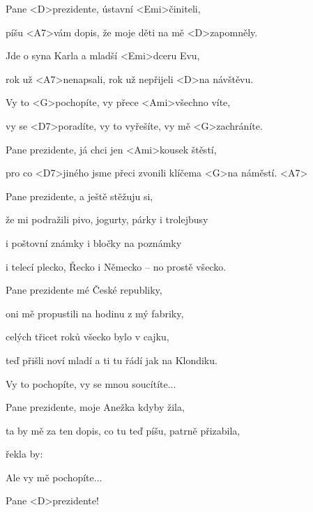

\zs
Pane <D>prezidente, ústavní <Emi>činiteli,

píšu <A7>vám dopis, že moje děti na mě <D>zapomněly.

Jde o syna Karla a mladší <Emi>dceru Evu,

rok už <A7>nenapsali, rok už nepřijeli <D>na návštěvu.
\ks

\zr
Vy to <G>pochopíte, vy přece <Ami>všechno víte,

vy se <D7>poradíte, vy to vyřešíte, vy mě <G>zachráníte.

Pane prezidente, já chci jen <Ami>kousek štěstí,

pro co <D7>jiného jsme přeci zvonili klíčema <G>na náměstí. <A7>
\kr

\zs
Pane prezidente, a ještě stěžuju si,

že mi podražili pivo, jogurty, párky i trolejbusy

i poštovní známky i bločky na poznámky

i telecí plecko, Řecko i Německo -- no prostě všecko.
\ks

\zr\kr

\zs
Pane prezidente mé České republiky,

oni mě propustili na hodinu z mý fabriky,

celých třicet roků všecko bylo v cajku,

teď přišli noví mladí a ti tu řádí jak na Klondiku.
\ks

\zr
Vy to pochopíte, vy se mnou soucítíte...
\kr

\zs
Pane prezidente, moje Anežka kdyby žila,

ta by mě za ten dopis, co tu teď píšu, patrně přizabila,

řekla by: 
\ks

\zr
Ale vy mě pochopíte...
\kr

Pane <D>prezidente!

\kp
